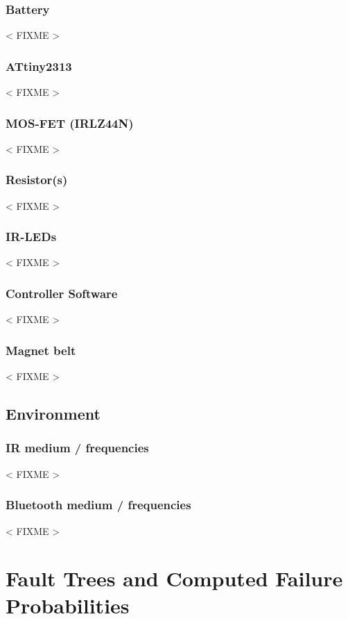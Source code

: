 \documentclass[a4paper,parskip,headheight=38pt]{scrartcl} %
\newcommand{\incomplete}[1]{\textless{} #1 \textgreater{}}
\begin{document}
\subsubsection{Battery}
\incomplete{FIXME}

\subsubsection{ATtiny2313}
\incomplete{FIXME}

\subsubsection{MOS-FET (IRLZ44N)}
\incomplete{FIXME}

\subsubsection{Resistor(s)}
\incomplete{FIXME}

\subsubsection{IR-LEDs}
\incomplete{FIXME}

\subsubsection{Controller Software}
\incomplete{FIXME}

\subsubsection{Magnet belt}
\incomplete{FIXME}

\subsection{Environment} %

\subsubsection{IR medium / frequencies}
\incomplete{FIXME}

\subsubsection{Bluetooth medium / frequencies}

\incomplete{FIXME}


\section{Fault Trees and Computed Failure Probabilities}
\end{document}
